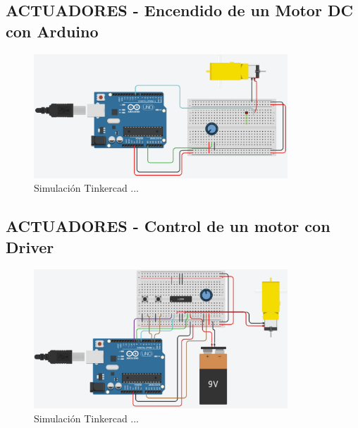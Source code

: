 \documentclass{article}
\begin{document}


\subsection{ACTUADORES - Encendido de un Motor DC con Arduino}

\begin{figure}[H]
    \centering
    \includegraphics[width=0.85\textwidth]{./img/ckpt_encendido_motor.png}
    \caption{Simulación Tinkercad ...}
    \label{fig:encendido_motor}
\end{figure}


\subsection{ACTUADORES - Control de un motor con Driver}


\begin{figure}[H]
    \centering
    \includegraphics[width=0.85\textwidth]{./img/ckpt_motor_driver.png}
    \caption{Simulación Tinkercad ...}
    \label{fig:motor_driver}
\end{figure}
\end{document}

